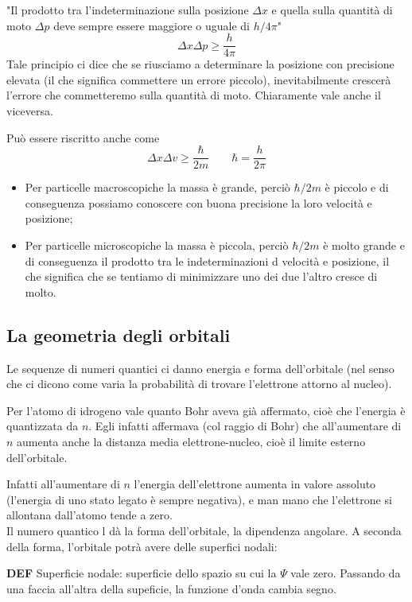 "Il prodotto tra l'indeterminazione sulla posizione $\Delta x$ e quella sulla quantità di moto $\Delta p$ deve sempre essere maggiore o uguale di $h/4\pi$"
$$\Delta x \Delta p \geq \frac{h}{4\pi}$$
Tale principio ci dice che se riusciamo a determinare la posizione con precisione elevata (il che significa commettere un errore piccolo), inevitabilmente crescerà l'errore che commetteremo sulla quantità di moto. Chiaramente vale anche il viceversa.

Può essere riscritto anche come
$$\Delta x \Delta v \geq \frac{\hbar}{2m} \qquad \hbar=\frac{h}{2\pi}$$
\begin{itemize}
  \item Per particelle macroscopiche la massa è grande, perciò $\hbar/2m$ è piccolo e di conseguenza possiamo conoscere con buona precisione la loro velocità e posizione;
  \item Per particelle microscopiche la massa è piccola, perciò $\hbar/2m$ è molto grande e di conseguenza il prodotto tra le indeterminazioni d velocità e posizione, il che significa che se tentiamo di minimizzare uno dei due l'altro cresce di molto.
\end{itemize}

\subsection{La geometria degli orbitali}
Le sequenze di numeri quantici ci danno energia e forma dell'orbitale (nel senso che ci dicono come varia la probabilità di trovare l'elettrone attorno al nucleo).

Per l'atomo di idrogeno vale quanto Bohr aveva già affermato, cioè che l'energia è quantizzata da $n$. Egli infatti affermava (col raggio di Bohr) che all'aumentare di $n$ aumenta anche la distanza media elettrone-nucleo, cioè il limite esterno dell'orbitale.

Infatti all'aumentare di $n$ l'energia dell'elettrone aumenta in valore assoluto (l'energia di uno stato legato è sempre negativa), e man mano che l'elettrone si allontana dall'atomo tende a zero.\\

Il numero quantico l dà la forma dell'orbitale, la dipendenza angolare. A seconda della forma, l'orbitale potrà avere delle superfici nodali:

\textbf{DEF} Superficie nodale: superficie dello spazio su cui la $\Psi$ vale zero. Passando da una faccia all'altra della supeficie, la funzione d'onda cambia segno.

